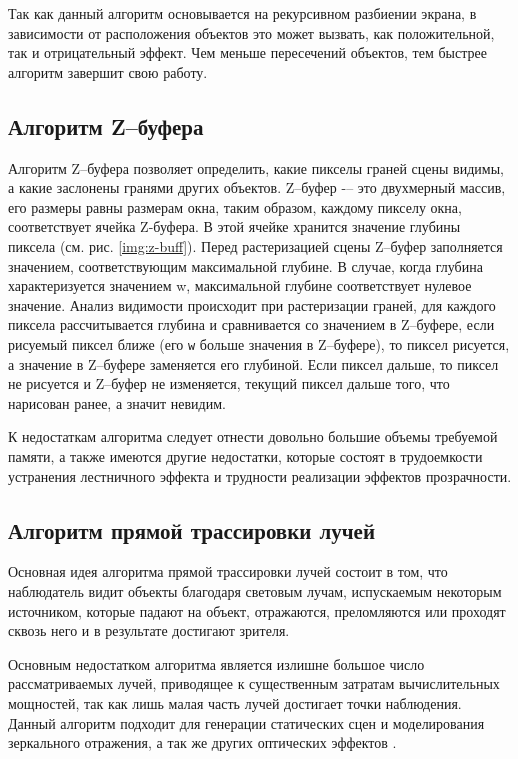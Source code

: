 
Так как данный алгоритм основывается на рекурсивном разбиении экрана, в зависимости от расположения объектов это может вызвать, как положительной, так и отрицательный эффект. Чем меньше пересечений объектов, тем быстрее алгоритм завершит свою работу.

\subsection{Алгоритм Z--буфера}

Алгоритм Z--буфера \cite{rogers,shykin} позволяет определить, какие пикселы граней сцены видимы, а какие заслонены гранями других объектов. Z--буфер -– это двухмерный массив, его размеры равны размерам окна, таким образом, каждому пикселу окна, соответствует ячейка Z-буфера. В этой ячейке хранится значение глубины пиксела (см. рис. \ref{img:z-buff}). Перед растеризацией сцены Z--буфер заполняется значением, соответствующим максимальной глубине. В случае, когда глубина характеризуется значением w,
максимальной глубине соответствует нулевое значение. Анализ видимости происходит при растеризации граней, для каждого пиксела рассчитывается глубина и сравнивается со значением в Z--буфере, если рисуемый пиксел ближе (его \texttt{w} больше значения в Z--буфере), то пиксел рисуется, а значение
в Z--буфере заменяется его глубиной. Если пиксел дальше, то пиксел не рисуется и Z--буфер не изменяется, текущий пиксел дальше того, что нарисован ранее, а значит невидим. 


К недостаткам алгоритма следует отнести довольно большие объемы требуемой памяти, а также имеются другие недостатки, которые состоят в трудоемкости устранения лестничного эффекта и трудности реализации эффектов прозрачности.

\subsection{Алгоритм прямой трассировки лучей}

Основная идея алгоритма прямой трассировки лучей \cite{shykin} состоит в том, что наблюдатель видит объекты благодаря световым лучам, испускаемым некоторым источником, которые падают на объект, отражаются, преломляются или проходят сквозь него и в результате достигают зрителя.

Основным недостатком алгоритма является излишне большое число рассматриваемых лучей, приводящее к существенным затратам вычислительных мощностей, так как лишь малая часть лучей достигает точки наблюдения. Данный алгоритм подходит для генерации статических сцен и моделирования
зеркального отражения, а так же других оптических эффектов \cite{traceproblem}.

